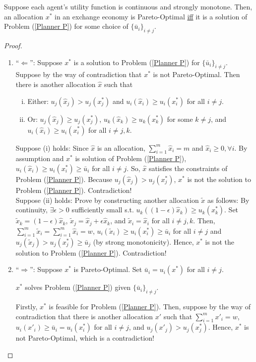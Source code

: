 \documentclass[11pt]{elegantbook}
\begin{document}
\begin{proposition}
    Suppose each agent's utility function is continuous and strongly monotone. Then, an allocation $x^*$ in an exchange economy is Pareto-Optimal \underline{iff} it is a solution of Problem (\ref{Planner P}) for some choice of $\{\bar{u}_i\}_{i\neq j}$.
\end{proposition}
\begin{proof}
    \begin{enumerate}
        \item ``$\Leftarrow$'': Suppose $x^*$ is a solution to Problem (\ref{Planner P}) for $\{\bar{u}_i\}_{i\neq j}$. Suppose by the way of contradiction that $x^*$ is not Pareto-Optimal. Then there is another allocation $\hat{x}$ such that
        \begin{enumerate}[(i).]
            \item Either: $u_j(\hat{x}_j)> u_j(x^*_j)$ and $u_i(\hat{x}_i)\geq u_i(x^*_i)$ for all $i\neq j$.
            \item Or: $u_j(\hat{x}_j)\geq u_j(x^*_j)$, $u_k(\hat{x}_k)\geq u_k(x^*_k)$ for some $k\neq j$, and $u_i(\hat{x}_i)\geq u_i(x^*_i)$ for all $i\neq j,k$.
        \end{enumerate}
        Suppose (i) holds: Since $\hat{x}$ is an allocation, $\sum_{i=1}^m \hat{x}_i = m$ and $\hat{x}_i\geq 0, \forall i$. By assumption and $x^*$ is solution of Problem (\ref{Planner P}), $u_i(\hat{x}_i)\geq u_i(x^*_i)\geq \bar{u}_i$ for all $i\neq j$. So, $\hat{x}$ satisfies the constraints of Problem (\ref{Planner P}). Because $u_j(\hat{x}_j)> u_j(x^*_j)$, $x^*$ is not the solution to Problem (\ref{Planner P}). Contradiction!\\
        Suppose (ii) holds: Prove by constructing another allocation $\tilde{x}$ as follows: By continuity, $\exists \epsilon>0$ sufficiently small s.t. $u_k((1-\epsilon)\hat{x}_k)\geq u_k(x^*_k)$. Set $\tilde{x}_k=(1-\epsilon)\hat{x}_k$, $\tilde{x}_j=\hat{x}_j+\epsilon \hat{x}_k$, and $\tilde{x}_i=\hat{x}_i$ for all $i\neq j,k$. Then, $\sum_{i=1}^m \tilde{x}_i=\sum_{i=1}^m \hat{x}_i=w$, $u_i(\tilde{x}_i)\geq u_i(x^*_i)\geq \bar{u}_i$ for all $i\neq j$ and $u_j(\tilde{x}_j)> u_j(x^*_j)\geq \bar{u}_j$ (by strong monotonicity). Hence, $x^*$ is not the solution to Problem (\ref{Planner P}). Contradiction!
        \item ``$\Rightarrow$'': Suppose $x^*$ is Pareto-Optimal. Set $\bar{u}_i=u_i(x^*)$ for all $i\neq j$.
        \begin{claim}
            $x^*$ solves Problem (\ref{Planner P}) given $\{\bar{u}_i\}_{i\neq j}$.
        \end{claim}
        Firstly, $x^*$ is feasible for Problem (\ref{Planner P}). Then, suppose by the way of contradiction that there is another allocation $x'$ such that $\sum_{i=1}^m x'_i=w$, $u_i(x'_i)\geq \bar{u}_i=u_i(x^*_i)$ for all $i\neq j$, and $u_j(x'_j)>u_j(x^*_j)$. Hence, $x^*$ is not Pareto-Optimal, which is a contradiction!
    \end{enumerate}
\end{proof}
\end{document}
